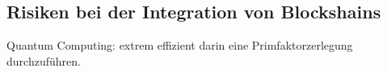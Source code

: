 

\subsection{Risiken bei der Integration von Blockshains}
\cite[p.~17]{pirafelnerblockchaintechnologie}


Quantum Computing:
extrem effizient darin eine Primfaktorzerlegung durchzuführen.